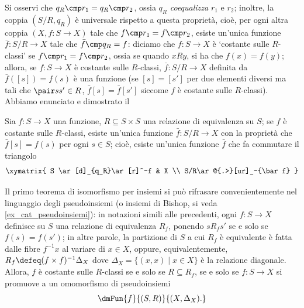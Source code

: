Si osservi che \(q_R\cmp r_1=q_R\cmp r_2\), ossia \(q_R\) \emph{coequalizza} \(r_1\) e \(r_2\); inoltre, la coppia \((S/R,q_R)\) è universale rispetto a questa proprietà, cioè, per ogni altra coppia \((X,f\colon S\to X)\) tale che \(f\cmp r_1=f\cmp r_2 \), esiste un'unica funzione \(\bar f\colon S/R\to X\) tale che \(\bar f\cmp q_R= f\):%
diciamo che \(f \colon S\to X\) è `costante sulle \(R\)-classi' se \(f\cmp r_1=f\cmp r_2 \), ossia se quando \(xRy\), si ha che \(f(x)=f(y)\); allora, se \(f \colon S\to X\) è costante sulle \(R\)-classi, \(\bar f\colon S/R \to X\) definita da \(\bar f([s])= f(s)\) è una funzione (se \([s]=[s']\) per due elementi diversi ma tali che \(\pair s{s'}\in R\), \(\bar f[s]=\bar f[s']\) siccome \(f\) è costante sulle \(R\)-classi). Abbiamo enunciato e dimostrato il
\begin{theorem}
	Sia \(f \colon S\to X\) una funzione, \(R\subseteq S\times S\) una relazione di equivalenza su \(S\); se \(f\) è costante sulle \(R\)-classi, esiste un'unica funzione \(\bar f \colon S/R \to X\) con la proprietà che \(\bar f[s]=f(s)\) per ogni \(s\in S\); cioè, esiste un'unica funzione \(\bar f\) che fa commutare il triangolo
	\[\xymatrix{
		S \ar[d]_{q_R}\ar[r]^-f & X \\
		S/R\ar@{.>}[ur]_-{\bar f}
		}\]
\end{theorem}
\Todo{}
\begin{remark}
	Il primo teorema di isomorfismo per insiemi si può rifrasare convenientemente nel linguaggio degli pseudoinsiemi (o insiemi di Bishop, si veda \ref{ex_cat_pseudoinsiemi}): in notazioni simili alle precedenti, ogni \(f \colon S\to X\) definisce su \(S\) una relazione di equivalenza \(R_f\), ponendo \(s R_f s'\) se e solo se \(f(s)=f(s')\); in altre parole, la partizione di \(S\) a cui \(R_f\) è equivalente è fatta dalle fibre \(f^{-1}x\) al variare di \(x\in X\), oppure, equivalentemente, \(R_f \defeq (f\times f)^{-1}\Delta_X\) dove \(\Delta_X = \{(x,x)\mid x\in X\}\) è la relazione diagonale. Allora, \(f\) è costante sulle \(R\)-classi se e solo se \(R\subseteq R_f\), se e solo se \(f \colon S\to X\) si promuove a un omomorfismo di pseudoinsiemi
	\[\dmFun{f}{(S,R)}{(X,\Delta_X).}\]
\end{remark}
